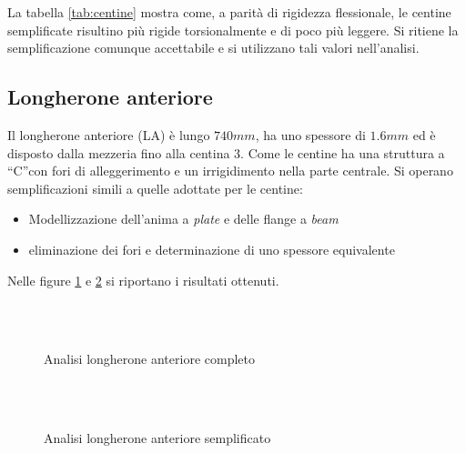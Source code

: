 \documentclass[
10pt, %
a4paper, %
oneside, %
headinclude,footinclude, %
BCOR5mm, %
]{scrartcl}
\begin{document}
La tabella \ref{tab:centine} mostra come, a parità di rigidezza flessionale, le centine semplificate risultino più rigide torsionalmente e di poco più leggere. Si ritiene la semplificazione comunque accettabile e si utilizzano tali valori nell'analisi.

\newpage

\subsection{Longherone anteriore}

Il longherone anteriore (LA) è lungo $740mm$, ha uno spessore di $1.6mm$ ed è disposto dalla mezzeria fino alla centina 3. Come le centine ha una struttura a \textquotedblleft C\textquotedblright con fori di alleggerimento e un irrigidimento nella parte centrale.
Si operano semplificazioni simili a quelle adottate per le centine:

\begin{itemize}
	\item Modellizzazione dell'anima a \emph{plate} e delle flange a \emph{beam}
	\item eliminazione dei fori e determinazione di uno spessore equivalente
\end{itemize}

Nelle figure \ref{fig:FS_compl} e \ref{fig:FS_simp} si riportano i risultati ottenuti.


\begin{figure}[htb]
	\centering
	 \\
	 \\
	\caption[Longherone anteriore completo]{Analisi longherone anteriore completo} %
	\label{fig:FS_compl}
\end{figure}


\begin{figure}[htb]
	\centering
	 \\
	 \\
	\caption[Longherone anteriore semplificato]{Analisi longherone anteriore semplificato} %
	\label{fig:FS_simp}
\end{figure}
\end{document}
